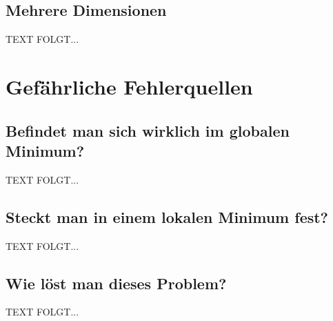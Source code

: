 \subsection{Mehrere Dimensionen}\label{Abs.3}
  TEXT FOLGT...



\section{Gefährliche Fehlerquellen}\label{Fehlerquellen}
\subsection{Befindet man sich wirklich im globalen Minimum?}\label{Abs.1}
  TEXT FOLGT...

\subsection{Steckt man in einem lokalen Minimum fest?}\label{Abs.2}
  TEXT FOLGT...

\subsection{Wie löst man dieses Problem?}\label{Abs.3}
  TEXT FOLGT...


